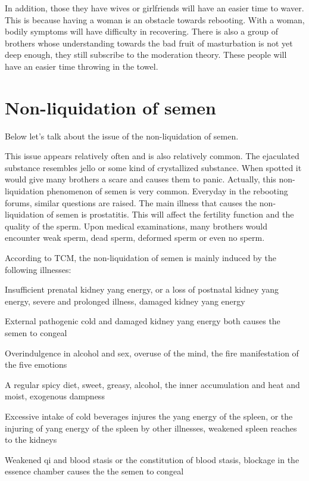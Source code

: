 \documentclass[
]{book}
\begin{document}
In addition, those they have wives or girlfriends will have an easier time to waver. This is because having a woman is an obstacle towards rebooting. With a woman, bodily symptoms will have difficulty in recovering. There is also a group of brothers whose understanding towards the bad fruit of masturbation is not yet deep enough, they still subscribe to the moderation theory. These people will have an easier time throwing in the towel.

\hypertarget{non-liquidation-of-semen}{%
\section{Non-liquidation of semen}\label{non-liquidation-of-semen}}

Below let's talk about the issue of the non-liquidation of semen.

This issue appears relatively often and is also relatively common. The ejaculated substance resembles jello or some kind of crystallized substance. When spotted it would give many brothers a scare and causes them to panic. Actually, this non-liquidation phenomenon of semen is very common. Everyday in the rebooting forums, similar questions are raised. The main illness that causes the non-liquidation of semen is prostatitis. This will affect the fertility function and the quality of the sperm. Upon medical examinations, many brothers would encounter weak sperm, dead sperm, deformed sperm or even no sperm.

According to TCM, the non-liquidation of semen is mainly induced by the following illnesses:

Insufficient prenatal kidney yang energy, or a loss of postnatal kidney yang energy, severe and prolonged illness, damaged kidney yang energy

External pathogenic cold and damaged kidney yang energy both causes the semen to congeal

Overindulgence in alcohol and sex, overuse of the mind, the fire manifestation of the five emotions

A regular spicy diet, sweet, greasy, alcohol, the inner accumulation and heat and moist, exogenous dampness

Excessive intake of cold beverages injures the yang energy of the spleen, or the injuring of yang energy of the spleen by other illnesses, weakened spleen reaches to the kidneys

Weakened qi and blood stasis or the constitution of blood stasis, blockage in the essence chamber causes the the semen to congeal
\end{document}
